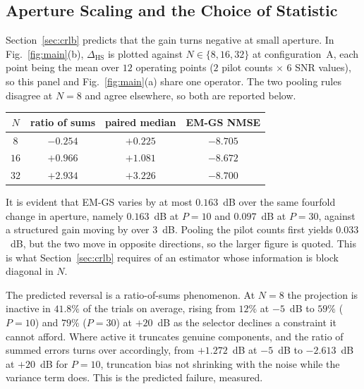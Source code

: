 \documentclass[journal]{IEEEtran}
\newcommand{\dhs}{\Delta_{\mathrm{HS}}}
\begin{document}
\subsection{Aperture Scaling and the Choice of Statistic}
\label{sec:aperture}

Section~\ref{sec:crlb} predicts that the gain turns negative at small aperture.
In Fig.~\ref{fig:main}(b), $\dhs$ is plotted against $N\in\{8,16,32\}$ at
configuration~A, each point being the mean over $12$ operating points ($2$ pilot
counts $\times$ $6$ SNR values), so this panel and Fig.~\ref{fig:main}(a) share
one operator. The two pooling rules disagree at $N=8$ and agree elsewhere, so
both are
reported below.

\begin{center}\footnotesize
\vspace{-2mm}
\begin{tabular}{cccc}
\toprule
$N$ & ratio of sums & paired median & EM-GS NMSE \\
\midrule
$8$  & $-0.254$ & $+0.225$ & $-8.705$ \\
$16$ & $+0.966$ & $+1.081$ & $-8.672$ \\
$32$ & $+2.934$ & $+3.226$ & $-8.700$ \\
\bottomrule
\end{tabular}
\vspace{-3mm}
\end{center}

\noindent It is evident that EM-GS varies by at most $0.163$~dB over the same
fourfold change in aperture, namely $0.163$~dB at $P=10$ and $0.097$~dB at
$P=30$, against a structured gain moving by over $3$~dB. Pooling the pilot
counts first yields $0.033$~dB, but the two move in opposite directions, so the
larger figure is quoted. This is what Section~\ref{sec:crlb} requires of an
estimator whose information is block diagonal in $N$.

The predicted reversal is a ratio-of-sums phenomenon. At $N=8$ the projection is
inactive in $41.8\%$ of the trials on average, rising from $12\%$ at $-5$~dB to
$59\%$ ($P=10$) and $79\%$ ($P=30$) at $+20$~dB as the selector declines a
constraint it cannot afford. Where active it truncates genuine components, and
the ratio of summed errors turns over accordingly, from $+1.272$~dB at $-5$~dB
to $-2.613$~dB at $+20$~dB for $P=10$, truncation bias not shrinking with the
noise while the variance term does. This is the predicted failure, measured.
\end{document}
